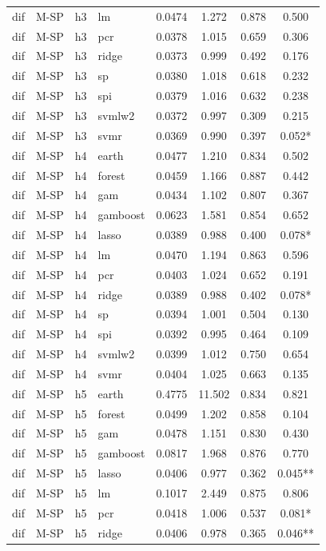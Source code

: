 \begin{ThreePartTable}
\begin{longtable}[t]{llclcccc}
dif & M-SP & h3 & lm & 0.0474 & 1.272 & 0.878 & 0.500\\
dif & M-SP & h3 & pcr & 0.0378 & 1.015 & 0.659 & 0.306\\
dif & M-SP & h3 & ridge & 0.0373 & 0.999 & 0.492 & 0.176\\
dif & M-SP & h3 & sp & 0.0380 & 1.018 & 0.618 & 0.232\\
dif & M-SP & h3 & spi & 0.0379 & 1.016 & 0.632 & 0.238\\
dif & M-SP & h3 & svmlw2 & 0.0372 & 0.997 & 0.309 & 0.215\\
dif & M-SP & h3 & svmr & 0.0369 & 0.990 & 0.397 & 0.052*\\
\addlinespace
dif & M-SP & h4 & earth & 0.0477 & 1.210 & 0.834 & 0.502\\
dif & M-SP & h4 & forest & 0.0459 & 1.166 & 0.887 & 0.442\\
dif & M-SP & h4 & gam & 0.0434 & 1.102 & 0.807 & 0.367\\
dif & M-SP & h4 & gamboost & 0.0623 & 1.581 & 0.854 & 0.652\\
dif & M-SP & h4 & lasso & 0.0389 & 0.988 & 0.400 & 0.078*\\
dif & M-SP & h4 & lm & 0.0470 & 1.194 & 0.863 & 0.596\\
dif & M-SP & h4 & pcr & 0.0403 & 1.024 & 0.652 & 0.191\\
dif & M-SP & h4 & ridge & 0.0389 & 0.988 & 0.402 & 0.078*\\
dif & M-SP & h4 & sp & 0.0394 & 1.001 & 0.504 & 0.130\\
dif & M-SP & h4 & spi & 0.0392 & 0.995 & 0.464 & 0.109\\
dif & M-SP & h4 & svmlw2 & 0.0399 & 1.012 & 0.750 & 0.654\\
dif & M-SP & h4 & svmr & 0.0404 & 1.025 & 0.663 & 0.135\\
\addlinespace
dif & M-SP & h5 & earth & 0.4775 & 11.502 & 0.834 & 0.821\\
dif & M-SP & h5 & forest & 0.0499 & 1.202 & 0.858 & 0.104\\
dif & M-SP & h5 & gam & 0.0478 & 1.151 & 0.830 & 0.430\\
dif & M-SP & h5 & gamboost & 0.0817 & 1.968 & 0.876 & 0.770\\
dif & M-SP & h5 & lasso & 0.0406 & 0.977 & 0.362 & 0.045**\\
dif & M-SP & h5 & lm & 0.1017 & 2.449 & 0.875 & 0.806\\
dif & M-SP & h5 & pcr & 0.0418 & 1.006 & 0.537 & 0.081*\\
dif & M-SP & h5 & ridge & 0.0406 & 0.978 & 0.365 & 0.046**\\

\end{longtable}
\end{ThreePartTable}
